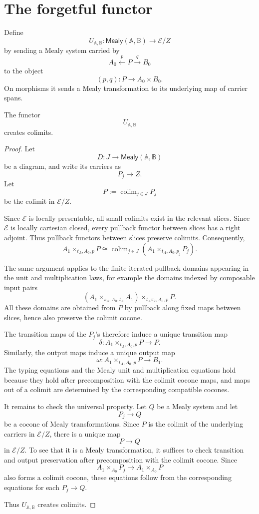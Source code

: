 \section{The forgetful functor}
\label{sec:mealy-forgetful-functor}

Define
\[
U_{\mathbb A,\mathbb B}:
\mathsf{Mealy}(\mathbb A,\mathbb B)
\longrightarrow
\mathcal E/Z
\]
by sending a Mealy system carried by
\[
A_0\xleftarrow{p}P\xrightarrow{q}B_0
\]
to the object
\[
(p,q):P\to A_0\times B_0.
\]
On morphisms it sends a Mealy transformation to its underlying map of carrier
spans.

\begin{proposition}
\label{prop:mealy-forgetful-creates-colimits}
The functor
\[
U_{\mathbb A,\mathbb B}
\]
creates colimits.
\end{proposition}

\begin{proof}
Let
\[
D:J\to \mathsf{Mealy}(\mathbb A,\mathbb B)
\]
be a diagram, and write its carriers as
\[
P_j\to Z.
\]
Let
\[
P:=\operatorname{colim}_{j\in J}P_j
\]
be the colimit in \(\mathcal E/Z\).

Since \(\mathcal E\) is locally presentable, all small colimits exist in the
relevant slices. Since \(\mathcal E\) is locally cartesian closed, every
pullback functor between slices has a right adjoint. Thus pullback functors
between slices preserve colimits. Consequently,
\[
A_1\times_{t_A,A_0,p}P
\cong
\operatorname{colim}_{j\in J}
\left(
A_1\times_{t_A,A_0,p_j}P_j
\right).
\]

The same argument applies to the finite iterated pullback domains appearing
in the unit and multiplication laws, for example the domains indexed by
composable input pairs
\[
(A_1\times_{s_A,A_0,t_A}A_1)\times_{t_A\pi_2,A_0,p}P.
\]
All these domains are obtained from \(P\) by pullback along fixed maps between
slices, hence also preserve the colimit cocone.

The transition maps of the \(P_j\)'s therefore induce a unique transition map
\[
\delta:
A_1\times_{t_A,A_0,p}P\to P.
\]
Similarly, the output maps induce a unique output map
\[
\omega:
A_1\times_{t_A,A_0,p}P\to B_1.
\]
The typing equations and the Mealy unit and multiplication equations hold
because they hold after precomposition with the colimit cocone maps, and maps
out of a colimit are determined by the corresponding compatible cocones.

It remains to check the universal property. Let \(Q\) be a Mealy system and
let
\[
P_j\to Q
\]
be a cocone of Mealy transformations. Since \(P\) is the colimit of the
underlying carriers in \(\mathcal E/Z\), there is a unique map
\[
P\to Q
\]
in \(\mathcal E/Z\). To see that it is a Mealy transformation, it suffices to
check transition and output preservation after precomposition with the
colimit cocone. Since
\[
A_1\times_{A_0}P_j\to A_1\times_{A_0}P
\]
also forms a colimit cocone, these equations follow from the corresponding
equations for each \(P_j\to Q\).

Thus \(U_{\mathbb A,\mathbb B}\) creates colimits.
\end{proof}

